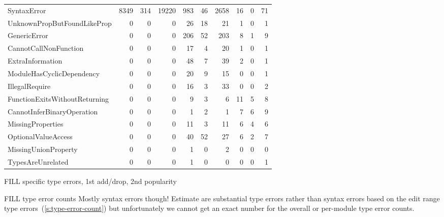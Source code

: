 \documentclass[english,submission,cleveref]{programming}
\begin{document}
\begin{table}[t]
\begin{tabular}{lr@{}r@{}rr@{}r@{}rr@{}r@{}r}
      SyntaxError & {8349} & {314} & {19220} & {983} & {46} & {2658} & {16} & {0} & {71} \\
      UnknownPropButFoundLikeProp & {0} & {0} & {0} & {26} & {18} & {21} & {1} & {0} & {1} \\
      GenericError & {0} & {0} & {0} & {206} & {52} & {203} & {8} & {1} & {9} \\
      CannotCallNonFunction & {0} & {0} & {0} & {17} & {4} & {20} & {1} & {0} & {1} \\
      ExtraInformation & {0} & {0} & {0} & {48} & {7} & {39} & {2} & {0} & {1} \\
      ModuleHasCyclicDependency & {0} & {0} & {0} & {20} & {9} & {15} & {0} & {0} & {1} \\
      IllegalRequire & {0} & {0} & {0} & {16} & {3} & {33} & {0} & {0} & {2} \\
      FunctionExitsWithoutReturning & {0} & {0} & {0} & {9} & {3} & {6} & {11} & {5} & {8} \\
      CannotInferBinaryOperation & {0} & {0} & {0} & {1} & {2} & {1} & {7} & {6} & {9} \\
      MissingProperties & {0} & {0} & {0} & {11} & {3} & {11} & {6} & {4} & {6} \\
      OptionalValueAccess & {0} & {0} & {0} & {40} & {52} & {27} & {6} & {2} & {7} \\
      MissingUnionProperty & {0} & {0} & {0} & {1} & {0} & {2} & {0} & {0} & {0} \\
      TypesAreUnrelated & {0} & {0} & {0} & {1} & {0} & {0} & {0} & {0} & {1} \\
    \end{tabular}

\end{table}


FILL specific type errors, 1st add/drop, 2nd popularity

FILL type error counts
Mostly syntax errors though!
Estimate  are substantial type errors rather than syntax
errors based on the edit range type errors~(\cref{s:type-error-count})
but unfortunately we cannot get an exact number for the overall
or per-module type error counts.
\end{document}
